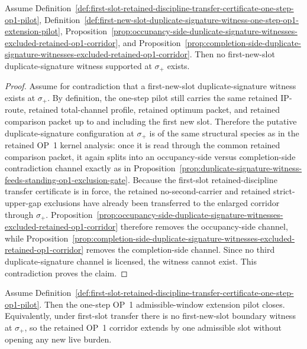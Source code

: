 \begin{proposition}
\label{prop:under-first-slot-transfer-no-duplicate-signature-witness-survives-at-sigma-plus}
Assume Definition~\ref{def:first-slot-retained-discipline-transfer-certificate-one-step-op1-pilot}, Definition~\ref{def:first-new-slot-duplicate-signature-witness-one-step-op1-extension-pilot}, Proposition~\ref{prop:occupancy-side-duplicate-signature-witnesses-excluded-retained-op1-corridor}, and Proposition~\ref{prop:completion-side-duplicate-signature-witnesses-excluded-retained-op1-corridor}. Then no first-new-slot duplicate-signature witness supported at $\sigma_{+}$ exists.
\end{proposition}

\begin{proof}
Assume for contradiction that a first-new-slot duplicate-signature witness exists at $\sigma_{+}$. By definition, the one-step pilot still carries the same retained IP-route, retained total-channel profile, retained optimum packet, and retained comparison packet up to and including the first new slot. Therefore the putative duplicate-signature configuration at $\sigma_{+}$ is of the same structural species as in the retained OP~1 kernel analysis: once it is read through the common retained comparison packet, it again splits into an occupancy-side versus completion-side contradiction channel exactly as in Proposition~\ref{prop:duplicate-signature-witness-feeds-standing-op1-exclusion-gate}. Because the first-slot retained-discipline transfer certificate is in force, the retained no-second-carrier and retained strict-upper-gap exclusions have already been transferred to the enlarged corridor through $\sigma_{+}$. Proposition~\ref{prop:occupancy-side-duplicate-signature-witnesses-excluded-retained-op1-corridor} therefore removes the occupancy-side channel, while Proposition~\ref{prop:completion-side-duplicate-signature-witnesses-excluded-retained-op1-corridor} removes the completion-side channel. Since no third duplicate-signature channel is licensed, the witness cannot exist. This contradiction proves the claim.
\end{proof}

\begin{corollary}
\label{cor:closure-one-step-op1-admissible-window-extension-pilot-under-first-slot-transfer}
Assume Definition~\ref{def:first-slot-retained-discipline-transfer-certificate-one-step-op1-pilot}. Then the one-step OP~1 admissible-window extension pilot closes. Equivalently, under first-slot transfer there is no first-new-slot boundary witness at $\sigma_{+}$, so the retained OP~1 corridor extends by one admissible slot without opening any new live burden.
\end{corollary}

